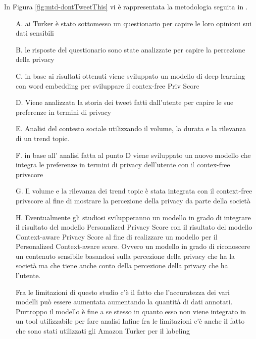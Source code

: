 In Figura \ref{fig:mtd-dontTweetThis} vi è rappresentata la metodologia seguita in \cite{dontTweetThis}.

\begin{enumerate}
\item [A.]ai Turker è stato sottomesso un questionario per capire le loro opinioni sui dati sensibili
\item [B.]le risposte del questionario sono state analizzate per capire la percezione della privacy
\item [C.]in base ai risultati ottenuti viene sviluppato un modello di deep learning con word embedding per sviluppare il contex-free Priv Score
\item [D.]Viene analizzata la storia dei tweet fatti dall’utente per capire le sue preferenze in termini di privacy
\item [E.]Analisi del contesto sociale utilizzando il volume, la durata e la rilevanza di un trend topic. 
\item [F.]in base all' analisi fatta al punto D viene sviluppato un nuovo modello che integra le preferenze in termini di privacy dell'utente con il contex-free privscore
\item [G.]Il volume e la rilevanza dei trend topic è stata integrata con il context-free privscore al fine di mostrare la percezione della privacy da parte della società
\item [H.]Eventualmente gli studiosi svilupperanno un modello in grado di integrare il risultato del modello Personalized Privacy Score con il risultato del modello Context-aware Privacy Score al fine di realizzare un modello per il Personalized Context-aware score. Ovvero un modello in grado di riconoscere un contenuto sensibile basandosi sulla percezione della privacy che ha la società ma che tiene anche conto della percezione della privacy che ha l'utente.

Fra le limitazioni di questo studio c'è il fatto che l'accuratezza dei vari modelli può essere aumentata aumentando la quantità di dati annotati. Purtroppo il modello è fine a se stesso in quanto esso non viene integrato in un tool utilizzabile per fare analisi Infine fra le limitazioni c'è anche il fatto che sono stati utilizzati gli Amazon Turker per il labeling
\end{enumerate}


